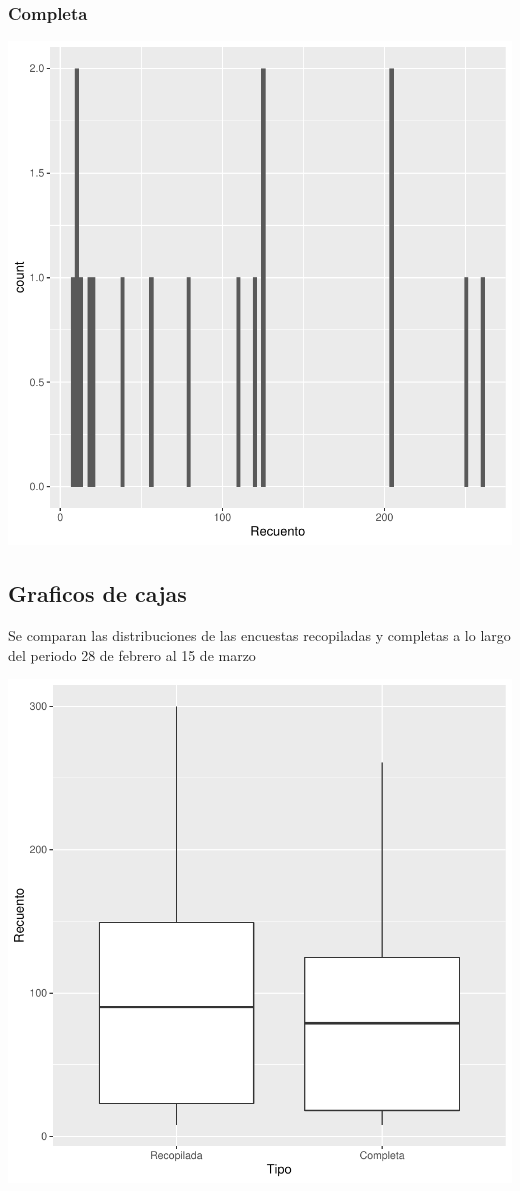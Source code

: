\documentclass{article}
\begin{document}
\subsubsection{Completa}

\includegraphics{seguimento2-023}

\subsection{Graficos de cajas}
Se comparan las distribuciones de las encuestas recopiladas y completas a lo largo del periodo 28 de febrero al 15 de marzo

\includegraphics{seguimento2-024}
\end{document}
